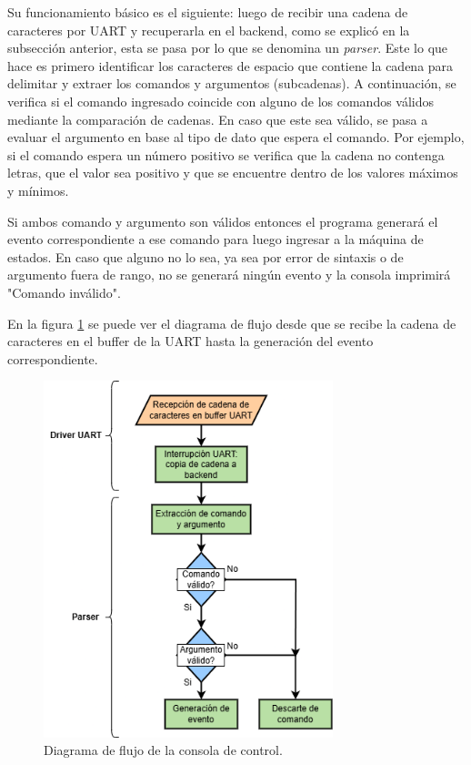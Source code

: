 Su funcionamiento básico es el siguiente: luego de recibir una cadena de caracteres por UART y recuperarla en el backend, como se explicó en la subsección anterior, esta se pasa por lo que se denomina un \textit{parser}. Este lo que hace es primero identificar los caracteres de espacio que contiene la cadena para delimitar y extraer los comandos y argumentos (subcadenas). A continuación, se verifica si el comando ingresado coincide con alguno de los comandos válidos mediante la comparación de cadenas. En caso que este sea válido, se pasa a evaluar el argumento en base al tipo de dato que espera el comando. Por ejemplo, si el comando espera un número positivo se verifica que la cadena no contenga letras, que el valor sea positivo y que se encuentre dentro de los valores máximos y mínimos.

Si ambos comando y argumento son válidos entonces el programa generará el evento correspondiente a ese comando para luego ingresar a la máquina de estados. En caso que alguno no lo sea, ya sea por error de sintaxis o de argumento fuera de rango, no se generará ningún evento y la consola imprimirá "Comando inválido".

En la figura \ref{fig:flowCmd} se puede ver el diagrama de flujo desde que se recibe la cadena de caracteres en el buffer de la UART hasta la generación del evento correspondiente.

\begin{figure}[H]
\centering
\includegraphics[width=0.75\textwidth]{./Figures/flowCmd.png}
\caption{Diagrama de flujo de la consola de control.}
\label{fig:flowCmd}
\end{figure}

